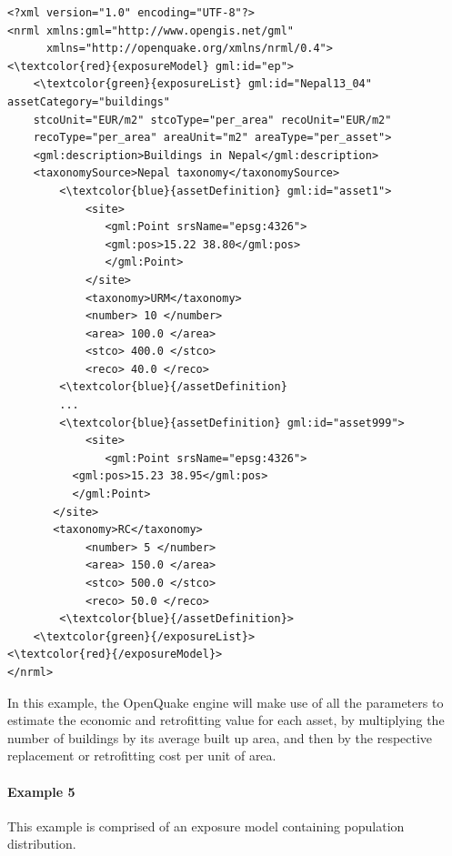 \begin{Verbatim}[frame=single, commandchars=\\\{\}, samepage=false]
<?xml version="1.0" encoding="UTF-8"?>
<nrml xmlns:gml="http://www.opengis.net/gml"
      xmlns="http://openquake.org/xmlns/nrml/0.4">
<\textcolor{red}{exposureModel} gml:id="ep">
    <\textcolor{green}{exposureList} gml:id="Nepal13_04" assetCategory="buildings" 
    stcoUnit="EUR/m2" stcoType="per_area" recoUnit="EUR/m2" 
    recoType="per_area" areaUnit="m2" areaType="per_asset">
    <gml:description>Buildings in Nepal</gml:description>
    <taxonomySource>Nepal taxonomy</taxonomySource>
        <\textcolor{blue}{assetDefinition} gml:id="asset1">
            <site>
               <gml:Point srsName="epsg:4326">
               <gml:pos>15.22 38.80</gml:pos>
               </gml:Point>
            </site>
            <taxonomy>URM</taxonomy>
            <number> 10 </number>
            <area> 100.0 </area>
            <stco> 400.0 </stco>
            <reco> 40.0 </reco>
        <\textcolor{blue}{/assetDefinition} 
        ...
        <\textcolor{blue}{assetDefinition} gml:id="asset999">
            <site>
               <gml:Point srsName="epsg:4326">
	      <gml:pos>15.23 38.95</gml:pos>
	      </gml:Point>
	   </site>
	   <taxonomy>RC</taxonomy>
            <number> 5 </number>
            <area> 150.0 </area>
            <stco> 500.0 </stco>
            <reco> 50.0 </reco>
        <\textcolor{blue}{/assetDefinition}> 
    <\textcolor{green}{/exposureList}>
<\textcolor{red}{/exposureModel}>
</nrml>
\end{Verbatim}

In this example, the OpenQuake engine will make use of all the parameters to estimate the economic and retrofitting value for each asset, by multiplying the number of buildings by its average built up area, and then by the respective replacement or retrofitting cost per unit of area. 

\paragraph{Example 5}
This example is comprised of an \gls{exposure model} containing population distribution.

